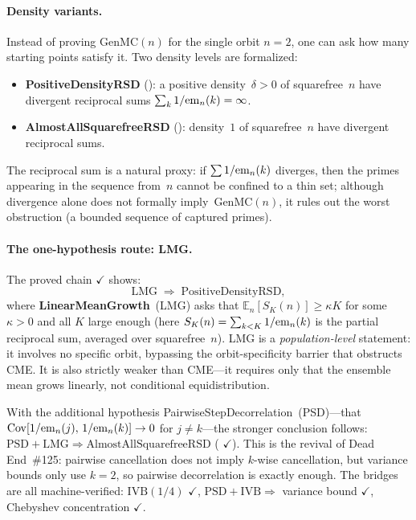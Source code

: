 \paragraph{Density variants.}
Instead of proving $\mathrm{GenMC}(n)$ for the single orbit $n = 2$,
one can ask how many starting points satisfy it.  Two density levels
are formalized:

\begin{itemize}
\item \textbf{PositiveDensityRSD}
  ():
  a positive density~$\delta > 0$ of squarefree~$n$ have divergent
  reciprocal sums $\sum_k 1/\mathrm{em}_{n}(k) = \infty$.

\item \textbf{AlmostAllSquarefreeRSD}
  ():
  density~$1$ of squarefree~$n$ have divergent reciprocal sums.
\end{itemize}

\noindent
The reciprocal sum is a natural proxy: if $\sum 1/\mathrm{em}_{n}(k)$
diverges, then the primes appearing in the sequence from~$n$ cannot be
confined to a thin set; although divergence alone does not formally
imply~$\mathrm{GenMC}(n)$, it rules out the worst obstruction (a
bounded sequence of captured primes).

\paragraph{The one-hypothesis route: LMG.}
The proved chain
{\color{leanink}$\checkmark$} shows:
\[
  \mathrm{LMG} \;\Longrightarrow\; \mathrm{PositiveDensityRSD},
\]
where \textbf{LinearMeanGrowth}~(LMG) asks that
$\mathbb{E}_n[S_K(n)] \geq \kappa K$ for some $\kappa > 0$ and all
$K$ large enough (here $S_K(n) = \sum_{k<K} 1/\mathrm{em}_{n}(k)$ is the
partial reciprocal sum, averaged over squarefree~$n$).
LMG is a \emph{population-level} statement: it involves no specific
orbit, bypassing the orbit-specificity barrier that obstructs CME\@.
It is also strictly weaker than CME---it requires only that the
ensemble mean grows linearly, not conditional equidistribution.

With the additional hypothesis PairwiseStepDecorrelation~(PSD)---that
$\operatorname{Cov}[1/\mathrm{em}_{n}(j),\, 1/\mathrm{em}_{n}(k)] \to 0$ for
$j \neq k$---the stronger conclusion follows:
$\mathrm{PSD} + \mathrm{LMG} \Rightarrow \mathrm{AlmostAllSquarefreeRSD}$
(
{\color{leanink}$\checkmark$}).
This is the revival of Dead End~\#125: pairwise cancellation does not
imply $k$-wise cancellation, but variance bounds only use $k = 2$, so
pairwise decorrelation is exactly enough.
The bridges are all machine-verified:
$\mathrm{IVB}(1/4)$ {\color{leanink}$\checkmark$},
$\mathrm{PSD} + \mathrm{IVB} \Rightarrow$ variance bound
{\color{leanink}$\checkmark$},
Chebyshev concentration {\color{leanink}$\checkmark$}.

